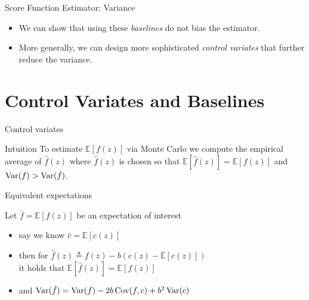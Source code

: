 \begin{frame}{Score Function Estimator: Variance}

\begin{itemize}
    \item We can show that using these \emph{baselines} do not bias the estimator. \pause
    \item More generally, we can design more sophisticated \emph{control variates} that further reduce the variance.
\end{itemize}

\end{frame}

\section{Control Variates and Baselines}

\frame{\tableofcontents[currentsection]}

\begin{frame}{Control variates}

\begin{alertblock}{Intuition}
To estimate $\mathbb E[f(z)]$ via Monte Carlo we compute the empirical average of $\hat f(z)$ where $\hat f(z)$ is chosen so that $\mathbb E[\hat f(z)] = \mathbb E[f(z)]$ and $\operatorname{Var}(f) > \operatorname{Var}(\hat f)$.
\end{alertblock}

\end{frame}



\begin{frame}{Equivalent expectations}

Let $\bar f = \mathbb E[f(z)]$ be an expectation of interest \pause
\begin{itemize}
	\item say we know $\bar c = \mathbb E[c(z)]$ \pause
	\item then for $\hat f(z) \triangleq f(z) - b(c(z) - \mathbb E[c(z)])$ \\ \pause
	it holds that $\mathbb E[\hat f(z)] = \mathbb E[f(z)]$ \pause
	\item and $\operatorname{Var}(\hat f) = \operatorname{Var}(f) - 2b \operatorname{Cov}(f, c) + b^2 \operatorname{Var}(c)$ 
\end{itemize}

\end{frame}

